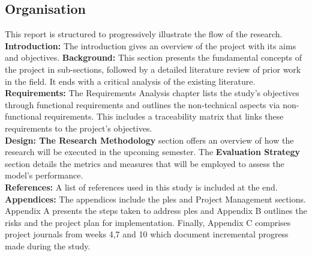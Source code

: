 \subsection{Organisation}
\label{sec:intro_orga}
This report is structured to progressively illustrate the flow of the research. \\ \vspace{0.3 cm}
\textbf{Introduction: }The introduction gives an overview of the project with its aims and objectives. 
\textbf{Background:} This section presents the fundamental concepts of the project in sub-sections, followed by a detailed literature review of prior work in the field. It ends with a critical analysis of the existing literature. \\
\textbf{Requirements: }The Requirements Analysis chapter lists the study's objectives through functional requirements and outlines the non-technical aspects via non-functional requirements. This includes a traceability matrix that links these requirements to the project's objectives. \\
\textbf{Design: The Research Methodology} section offers an overview of how the research will be executed in the upcoming semester. The \textbf{Evaluation Strategy} section details the metrics and measures that will be employed to assess the model’s performance. \\
\textbf{References:} A list of references used in this study is included at the end. \\
\textbf{Appendices:} The appendices include the \gls{ples} and Project  Management sections. Appendix A presents the steps taken to address \gls{ples} and Appendix B outlines the risks and the project plan for implementation. Finally, Appendix C comprises project journals from weeks 4,7 and 10 which document incremental progress made during the study. 